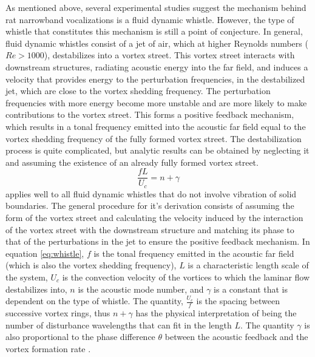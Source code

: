 \documentclass[twocolumn, prl]{revtex4}
\begin{document}
As mentioned above, several experimental studies suggest the mechanism behind rat narrowband vocalizations is a fluid dynamic whistle. However, the type of whistle that constitutes this mechanism is still a point of conjecture. In general, fluid dynamic whistles consist of a jet of air, which at higher Reynolds numbers ($Re>1000$), destabilizes into a vortex street. This vortex street interacts with downstream structures, radiating acoustic energy into the far field, and induces a velocity that provides energy to the perturbation frequencies, in the destabilized jet, which are close to the vortex shedding frequency. The perturbation frequencies with more energy become more unstable and are more likely to make contributions to the vortex street. This forms a positive feedback mechanism, which results in a tonal frequency emitted into the acoustic far field equal to the vortex shedding frequency of the fully formed vortex street. The destabilization process is quite complicated, but analytic results can be obtained by neglecting it and assuming the existence of an already fully formed vortex street.
\begin{equation}
\label{eq:whistle}
\frac{fL}{U_{c}}=n+\gamma
\end{equation}
applies well to all fluid dynamic whistles that do not involve vibration of solid boundaries. The general procedure for it's derivation consists of assuming the form of the vortex street and calculating the velocity induced by the interaction of the vortex street with the downstream structure and matching its phase to that of the perturbations in the jet to ensure the positive feedback mechanism. In equation \ref{eq:whistle}, $f$ is the tonal frequency emitted in the acoustic far field (which is also the vortex shedding frequency), $L$ is a characteristic length scale of the system, $U_c$ is the convection velocity of the vortices to which the laminar flow destabilizes into, $n$ is the acoustic mode number, and $\gamma$ is a constant that is dependent on the type of whistle. The quantity, $\frac{U_c}{f}$ is the spacing between successive vortex rings, thus $n+\gamma$ has the physical interpretation of being the number of disturbance wavelengths that can fit in the length $L$. The quantity $\gamma$ is also proportional to the phase difference $\theta$ between the acoustic feedback and the vortex formation rate \cite{Howe2008,Blake1986}.
\end{document}
